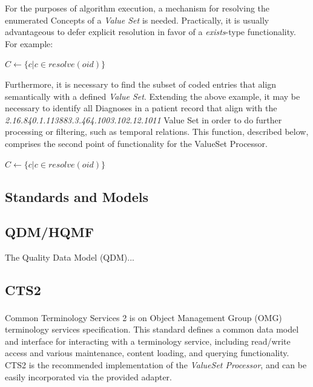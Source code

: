 \documentclass{amia}
\begin{document}
For the purposes of algorithm execution, a mechanism for resolving the enumerated Concepts of a \textit{Value Set} is needed. Practically, it is usually advantageous to defer explicit resolution in favor of a \textit{exists}-type functionality. For example:

\begin{algorithm}
\begin{algorithmic}[1]
  \State $C \gets \{c | c \in resolve(oid)\}$
  \State {}
\EndProcedure
\end{algorithmic}
\end{algorithm}

Furthermore, it is necessary to find the subset of coded entries that align semantically with a defined  \textit{Value Set}. Extending the above example, it may be necessary to identify all Diagnoses in a patient record that align with the \textit{2.16.840.1.113883.3.464.1003.102.12.1011} Value Set in order to do further processing or filtering, such as temporal relations. This function, described below, comprises the second point of functionality for the ValueSet Processor.

\begin{algorithm}
\begin{algorithmic}[1]
  \State $C \gets \{c | c \in resolve(oid)\}$
  \State {}
\EndProcedure
\end{algorithmic}
\end{algorithm}

\subsection*{Standards and Models}
\subsection*{QDM/HQMF}
The Quality Data Model (QDM)\cite{behilngquality}...
\subsection*{CTS2}
Common Terminology Services 2\cite{cts2} is on Object Management Group{\textsuperscript{\textregistered}} (OMG) terminology services specification. This standard defines a common data model and interface for interacting with a terminology service, including read/write access and various maintenance, content loading, and querying functionality. CTS2 is the recommended implementation of the \textit{ValueSet Processor}, and can be easily incorporated via the provided adapter.
\end{document}
